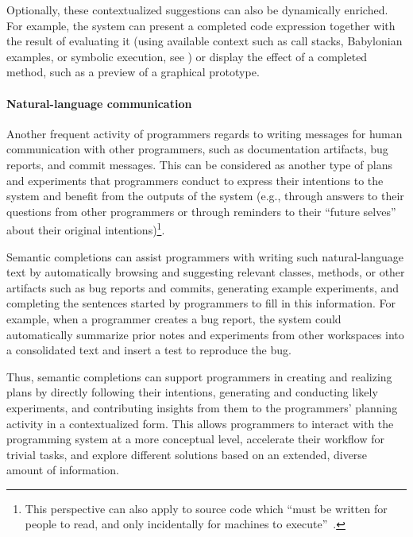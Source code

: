 Optionally, these contextualized suggestions can also be dynamically enriched.
For example, the system can present a completed code expression together with the result of evaluating it (using available context such as call stacks, Babylonian examples, or symbolic execution, see %
%
) or display the effect of a completed method, such as a preview of a graphical prototype.


\paragraph{Natural-language communication}
Another frequent activity of programmers regards to writing messages for human communication with other programmers, such as documentation artifacts, bug reports, and commit messages.
This can be considered as another type of plans and experiments that programmers conduct to express their intentions to the system and benefit from the outputs of the system (e.g., through answers to their questions from other programmers or through reminders to their ``future selves'' about their original intentions)\footnote{This perspective can also apply to source code which ``must be written for people to read,
and only incidentally for machines to execute''~\cite[p.~xxii]{abelson1996structure}.}.

Semantic completions can assist programmers with writing such natural-language text by automatically browsing and suggesting relevant classes, methods, or other artifacts such as bug reports and commits, generating example experiments, and completing the sentences started by programmers to fill in this information.
For example, when a programmer creates a bug report, the system could automatically summarize prior notes and experiments from other workspaces into a consolidated text and insert a test to reproduce the bug.

\ParSep

Thus, semantic completions can support programmers in creating and realizing plans by directly following their intentions, generating and conducting likely experiments, and contributing insights from them to the programmers' planning activity in a contextualized form.
This allows programmers to interact with the programming system at a more conceptual level, accelerate their workflow for trivial tasks, and explore different solutions based on an extended, diverse amount of information.

